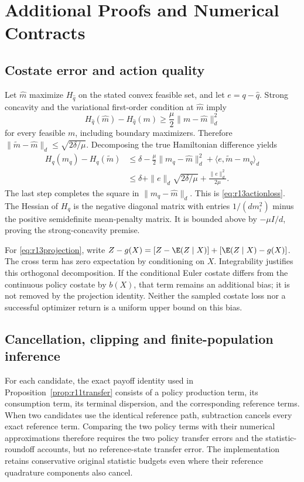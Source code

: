 \section{Additional Proofs and Numerical Contracts}\label{app:r13proofs}
\subsection{Costate error and action quality}
Let $\widehat m$ maximize $H_{\widehat q}$ on the stated convex feasible set, and let $e=q-\widehat q$. Strong concavity and the variational first-order condition at $\widehat m$ imply
\[
 H_{\widehat q}(\widehat m)-H_{\widehat q}(m)
       \geq \frac\mu2\|m-\widehat m\|_d^2
\]
for every feasible $m$, including boundary maximizers. Therefore
$\|\widetilde m-\widehat m\|_d\leq\sqrt{2\delta/\mu}$. Decomposing the true Hamiltonian difference yields
\begin{align*}
 H_q(m_q)-H_q(\widetilde m)
 &\leq \delta-\frac\mu2\|m_q-\widehat m\|_d^2
           +\langle e,\widetilde m-m_q\rangle_d\\
 &\leq \delta+\|e\|_d\sqrt{2\delta/\mu}+\frac{\|e\|_d^2}{2\mu}.
\end{align*}
The last step completes the square in $\|m_q-\widehat m\|_d$. This is \eqref{eq:r13actionloss}. The Hessian of $H_q$ is the negative diagonal matrix with entries $1/(dm_i^2)$ minus the positive semidefinite mean-penalty matrix. It is bounded above by $-\mu I/d$, proving the strong-concavity premise.

For \eqref{eq:r13projection}, write $Z-g(X)=[Z-\E(Z\mid X)]+[\E(Z\mid X)-g(X)]$. The cross term has zero expectation by conditioning on $X$. Integrability justifies this orthogonal decomposition. If the conditional Euler costate differs from the continuous policy costate by $b(X)$, that term remains an additional bias; it is not removed by the projection identity. Neither the sampled costate loss nor a successful optimizer return is a uniform upper bound on this bias.

\subsection{Cancellation, clipping and finite-population inference}
For each candidate, the exact payoff identity used in Proposition~\ref{prop:r11transfer} consists of a policy production term, its consumption term, its terminal dispersion, and the corresponding reference terms. When two candidates use the identical reference path, subtraction cancels every exact reference term. Comparing the two policy terms with their numerical approximations therefore requires the two policy transfer errors and the statistic-roundoff accounts, but no reference-state transfer error. The implementation retains conservative original statistic budgets even where their reference quadrature components also cancel.

